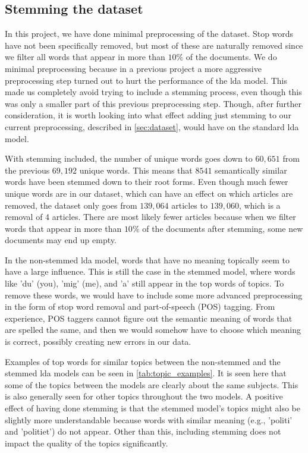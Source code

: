 \subsection{Stemming the dataset}\label{sec:stemming}
In this project, we have done minimal preprocessing of the dataset.
Stop words have not been specifically removed, but most of these are naturally removed since we filter all words that appear in more than $10\%$ of the documents.
We do minimal preprocessing because in a previous project a more aggressive preprocessing step turned out to hurt the performance of the \gls{lda} model.
This made us completely avoid trying to include a stemming process, even though this was only a smaller part of this previous preprocessing step.
Though, after further consideration, it is worth looking into what effect adding just stemming to our current preprocessing, described in \autoref{sec:dataset}, would have on the standard \gls{lda} model.

With stemming included, the number of unique words goes down to $60,651$ from the previous $69,192$ unique words.
This means that $8541$ semantically similar words have been stemmed down to their root forms.
Even though much fewer unique words are in our dataset, which can have an effect on which articles are removed, the dataset only goes from $139,064$ articles to $139,060$, which is a removal of 4 articles.
There are most likely fewer articles because when we filter words that appear in more than $10\%$ of the documents after stemming, some new documents may end up empty.

In the non-stemmed \gls{lda} model, words that have no meaning topically seem to have a large influence.
This is still the case in the stemmed model, where words like 'du' (you), 'mig' (me), and 'a' still appear in the top words of topics.
To remove these words, we would have to include some more advanced preprocessing in the form of stop word removal and part-of-speech (POS) tagging.
From experience, POS taggers cannot figure out the semantic meaning of words that are spelled the same, and then we would somehow have to choose which meaning is correct, possibly creating new errors in our data.

Examples of top words for similar topics between the non-stemmed and the stemmed \gls{lda} models can be seen in \autoref{tab:topic_examples}.
It is seen here that some of the topics between the models are clearly about the same subjects.
This is also generally seen for other topics throughout the two models.
A positive effect of having done stemming is that the stemmed model's topics might also be slightly more understandable because words with similar meaning (e.g., 'politi' and 'politiet') do not appear.
Other than this, including stemming does not impact the quality of the topics significantly.

